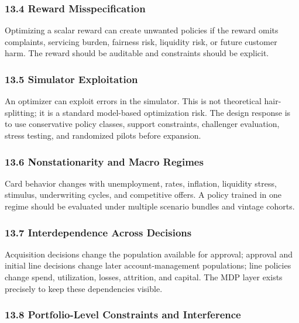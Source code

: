 \documentclass[
]{article}
\begin{document}
\hypertarget{reward-misspecification}{%
\subsubsection{13.4 Reward
Misspecification}\label{reward-misspecification}}

Optimizing a scalar reward can create unwanted policies if the reward
omits complaints, servicing burden, fairness risk, liquidity risk, or
future customer harm. The reward should be auditable and constraints
should be explicit.

\hypertarget{simulator-exploitation}{%
\subsubsection{13.5 Simulator
Exploitation}\label{simulator-exploitation}}

An optimizer can exploit errors in the simulator. This is not
theoretical hair-splitting; it is a standard model-based optimization
risk. The design response is to use conservative policy classes, support
constraints, challenger evaluation, stress testing, and randomized
pilots before expansion.

\hypertarget{nonstationarity-and-macro-regimes}{%
\subsubsection{13.6 Nonstationarity and Macro
Regimes}\label{nonstationarity-and-macro-regimes}}

Card behavior changes with unemployment, rates, inflation, liquidity
stress, stimulus, underwriting cycles, and competitive offers. A policy
trained in one regime should be evaluated under multiple scenario
bundles and vintage cohorts.

\hypertarget{interdependence-across-decisions}{%
\subsubsection{13.7 Interdependence Across
Decisions}\label{interdependence-across-decisions}}

Acquisition decisions change the population available for approval;
approval and initial line decisions change later account-management
populations; line policies change spend, utilization, losses, attrition,
and capital. The MDP layer exists precisely to keep these dependencies
visible.

\hypertarget{portfolio-level-constraints-and-interference}{%
\subsubsection{13.8 Portfolio-Level Constraints and
Interference}\label{portfolio-level-constraints-and-interference}}
\end{document}
